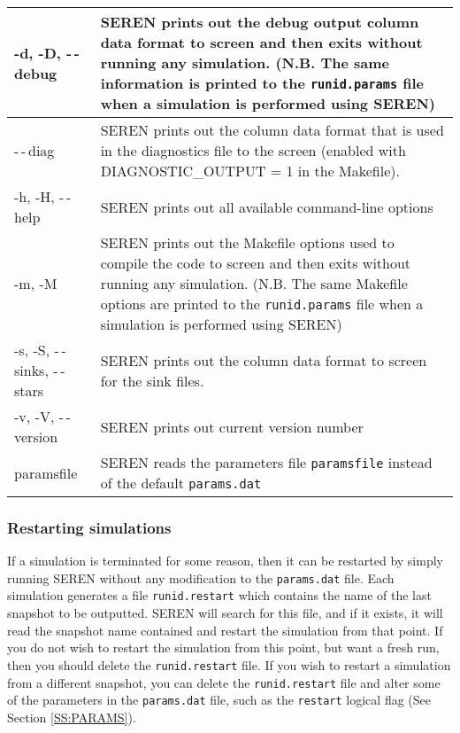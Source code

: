\documentclass[a4paper]{article}
\newcommand{\var}[1]{\texttt{#1}}
\begin{document}
\tabletail{\hline}
\tablelasttail{\hline}
\begin{center}
\begin{supertabular}{|p{4.0cm}|p{8.0cm}|}
-d, -D, -\,-\,debug & SEREN prints out the debug output column data format to screen and then exits without running any simulation. (N.B. The same information is printed to the \var{runid.params} file when a simulation is performed using SEREN) \\ \hline

-\,-\,diag & SEREN prints out the column data format that is used in the diagnostics file to the screen (enabled with DIAGNOSTIC\_OUTPUT = 1 in the Makefile). \\ \hline

-h, -H, -\,-\,help & SEREN prints out all available command-line options \\ \hline

-m, -M & SEREN prints out the Makefile options used to compile the code to screen and then exits without running any simulation.  (N.B. The same Makefile options are printed to the \var{runid.params} file when a simulation is performed using SEREN) \\ \hline

-s, -S, -\,-\,sinks, -\,-\,stars & SEREN prints out the column data format to screen for the sink files. \\ \hline

-v, -V, -\,-\,version & SEREN prints out current version number \\ \hline

paramsfile & SEREN reads the parameters file \var{paramsfile} instead of the default \var{params.dat} \\ \hline

\end{supertabular}
\end{center}
\vspace{1cm}



\subsubsection{Restarting simulations}
If a simulation is terminated for some reason, then it can be restarted by simply running SEREN without any modification to the \var{params.dat} file.  Each simulation generates a file \var{runid.restart} which contains the name of the last snapshot to be outputted.  SEREN will search for this file, and if it exists, it will read the snapshot name contained and restart the simulation from that point.  If you do not wish to restart the simulation from this point, but want a fresh run, then you should delete the \var{runid.restart} file.  If you wish to restart a simulation from a different snapshot, you can delete the \var{runid.restart} file and alter some of the parameters in the \var{params.dat} file, such as the \var{restart} logical flag (See Section \ref{SS:PARAMS}).  
\end{document}
